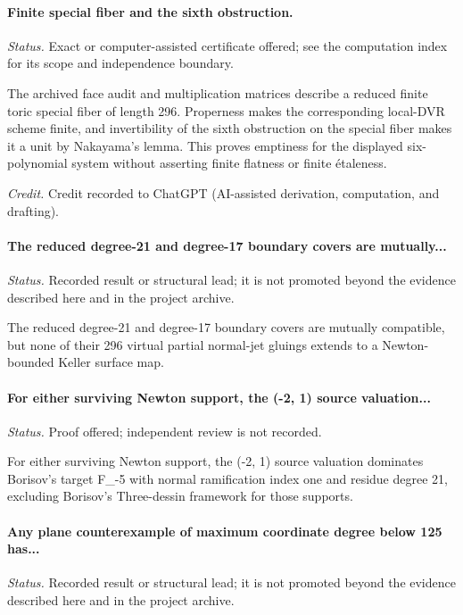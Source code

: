 \label{supp-note-06-023}
\paragraph{Finite special fiber and the sixth obstruction.}
\emph{Status.} Exact or computer-assisted certificate offered; see the computation index for its scope and independence boundary.

The archived face audit and multiplication matrices describe a reduced finite toric special fiber of length 296.  Properness makes the corresponding local-DVR scheme finite, and invertibility of the sixth obstruction on the special fiber makes it a unit by Nakayama's lemma.  This proves emptiness for the displayed six-polynomial system without asserting finite flatness or finite étaleness.

\emph{Credit.} Credit recorded to ChatGPT (AI-assisted derivation, computation, and drafting).

\label{supp-note-06-024}
\paragraph{The reduced degree-21 and degree-17 boundary covers are mutually...}
\emph{Status.} Recorded result or structural lead; it is not promoted beyond the evidence described here and in the project archive.

The reduced degree-21 and degree-17 boundary covers are mutually compatible, but none of their 296 virtual partial normal-jet gluings extends to a Newton-bounded Keller surface map.

\label{supp-note-06-025}
\paragraph{For either surviving Newton support, the (-2, 1) source valuation...}
\emph{Status.} Proof offered; independent review is not recorded.

For either surviving Newton support, the (-2, 1) source valuation dominates Borisov's target F\_-5 with normal ramification index one and residue degree 21, excluding Borisov's Three-dessin framework for those supports.

\label{supp-note-06-026}
\paragraph{Any plane counterexample of maximum coordinate degree below 125 has...}
\emph{Status.} Recorded result or structural lead; it is not promoted beyond the evidence described here and in the project archive.


